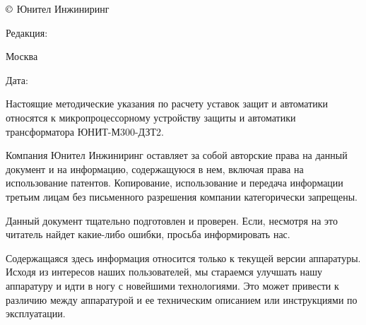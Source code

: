 \pagestyle{plain}

\pagecolor{white}

\noindent
$\copyright$ \the\year{} Юнител Инжиниринг
\hfill
\parbox{0.3\textwidth}{\raggedleft Редакция: \textcolor{unigray}{\rev}}

\vspace{3mm}
\noindent
Москва
\hfill
\parbox{0.3\textwidth}{\raggedleft Дата: \textcolor{unigray}{\revdate}}
\vspace{8mm}

\vskip 60mm

\noindent
Настоящие методические указания по расчету уставок защит и автоматики относятся к микропроцессорному устройству защиты и автоматики трансформатора ЮНИТ-М300-ДЗТ2.

\vskip 10mm
Компания Юнител Инжиниринг оставляет за собой авторские права на данный документ и на информацию, содержащуюся в нем, включая права на использование патентов. Копирование, использование и передача информации третьим лицам без письменного разрешения компании категорически запрещены.

\vskip 10mm
Данный документ тщательно подготовлен и проверен. Если, несмотря на это читатель найдет какие-либо ошибки, просьба информировать нас.

\vskip 10mm
Содержащаяся здесь информация относится только к текущей версии аппаратуры. Исходя из интересов наших пользователей, мы стараемся улучшать нашу аппаратуру и идти в ногу с новейшими технологиями. Это может привести к различию между аппаратурой и ее техническим описанием или инструкциями по эксплуатации.